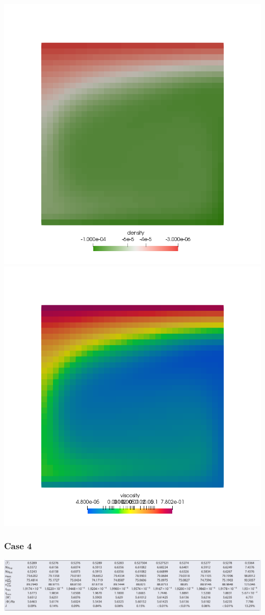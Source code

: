 \begin{center}
\includegraphics[width=7.cm]{python_codes/fieldstone_28/results_case3/rho}
\includegraphics[width=7.cm]{python_codes/fieldstone_28/results_case3/mueff}
\end{center}




\newpage %
\subsubsection*{Case 4}

\includegraphics[width=16cm]{python_codes/fieldstone_28/results_case4/tosn15}

